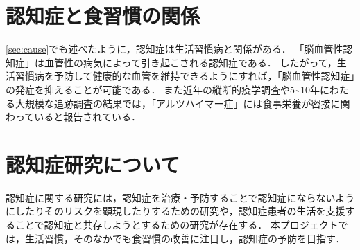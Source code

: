 \documentclass[../report]{subfiles}
\begin{document}
\section{認知症と食習慣の関係}
\ref{sec:cause}でも述べたように，認知症は生活習慣病と関係がある．
「脳血管性認知症」は血管性の病気によって引き起こされる認知症である．
したがって，生活習慣病を予防して健康的な血管を維持できるようにすれば，「脳血管性認知症」の発症を抑えることが可能である．
また近年の縦断的疫学調査や5\sim10年にわたる大規模な追跡調査の結果では，「アルツハイマー症」には食事栄養が密接に関わっていると報告されている\cite{nutrition-dementia-00}\cite{nutrition-dementia-01}．


\section{認知症研究について}
認知症に関する研究には，認知症を治療・予防することで認知症にならないようにしたりそのリスクを顕現したりするための研究や，認知症患者の生活を支援することで認知症と共存しようとするための研究が存在する．
本プロジェクトでは，生活習慣，そのなかでも食習慣の改善に注目し，認知症の予防を目指す．
\end{document}
